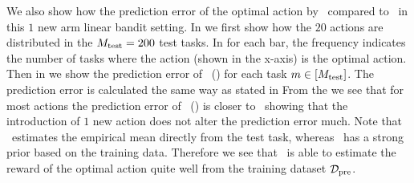 

We also show how the prediction error of the optimal action by \pred\ compared to \linucb\ in this $1$ new arm linear bandit setting. In  we first show how the $20$ actions are distributed in the $M_{\text{test}}=200$ test tasks. In  for each bar, the frequency indicates the number of tasks where the action (shown in the x-axis) is the optimal action. Then in  we show the prediction error of \pred\ (\gt) for each task $m\in[M_{\text{test}}]$. The prediction error is calculated the same way as stated in  
%
From the  we see that for most actions the prediction error of \pred\ (\gt) is closer to \linucb\ showing that the introduction of $1$ new action does not alter the prediction error much.
%
Note that \linucb\ estimates the empirical mean directly from the test task, whereas \pred\ has a strong prior based on the training data. Therefore we see that \pred\ is able to estimate the reward of the optimal action quite well from the training dataset $\mathcal{D}_{\text{pre}}$.
%

